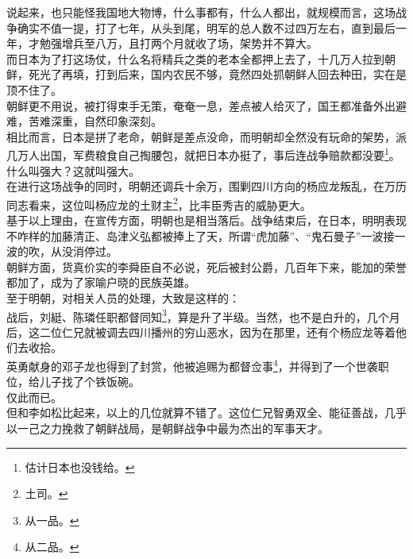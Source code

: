 \begin{multicols}{\theparacolNo}
说起来，也只能怪我国地大物博，什么事都有，什么人都出，就规模而言，这场战争确实不值一提，打了七年，从头到尾，明军的总人数不过四万左右，直到最后一年，才勉强增兵至八万，且打两个月就收了场，架势并不算大。\\

而日本为了打这场仗，什么名将精兵之类的老本全都押上去了，十几万人拉到朝鲜，死光了再填，打到后来，国内农民不够，竟然四处抓朝鲜人回去种田，实在是顶不住了。\\

朝鲜更不用说，被打得束手无策，奄奄一息，差点被人给灭了，国王都准备外出避难，苦难深重，自然印象深刻。\\

相比而言，日本是拼了老命，朝鲜是差点没命，而明朝却全然没有玩命的架势，派几万人出国，军费粮食自己掏腰包，就把日本办挺了，事后连战争赔款都没要\footnote{估计日本也没钱给。}。\\

什么叫强大？这就叫强大。\\

在进行这场战争的同时，明朝还调兵十余万，围剿四川方向的杨应龙叛乱，在万历同志看来，这位叫杨应龙的土财主\footnote{土司。}，比丰臣秀吉的威胁更大。\\

基于以上理由，在宣传方面，明朝也是相当落后。战争结束后，在日本，明明表现不咋样的加藤清正、岛津义弘都被捧上了天，所谓“虎加藤”、“鬼石曼子”一波接一波的吹，从没消停过。\\

朝鲜方面，货真价实的李舜臣自不必说，死后被封公爵，几百年下来，能加的荣誉都加了，成为了家喻户晓的民族英雄。\\

至于明朝，对相关人员的处理，大致是这样的：\\

战后，刘綎、陈璘任职都督同知\footnote{从一品。}，算是升了半级。当然，也不是白升的，几个月后，这二位仁兄就被调去四川播州的穷山恶水，因为在那里，还有个杨应龙等着他们去收拾。\\

英勇献身的邓子龙也得到了封赏，他被追赐为都督佥事\footnote{从二品。}，并得到了一个世袭职位，给儿子找了个铁饭碗。\\

仅此而已。\\

但和李如松比起来，以上的几位就算不错了。这位仁兄智勇双全、能征善战，几乎以一己之力挽救了朝鲜战局，是朝鲜战争中最为杰出的军事天才。\\


\end{multicols}
